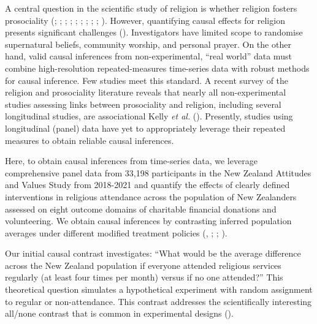 \documentclass[
  single column]{article}
\begin{document}
A central question in the scientific study of religion is whether
religion fosters prosociality (; ;
;
;
;
; ; ;
;
). However,
quantifying causal effects for religion presents significant challenges
(). Investigators
have limited scope to randomise supernatural beliefs, community worship,
and personal prayer. On the other hand, valid causal inferences from
non-experimental, ``real world'' data must combine high-resolution
repeated-measures time-series data with robust methods for causal
inference. Few studies meet this standard. A recent survey of the
religion and prosociality literature reveals that nearly all
non-experimental studies assessing links between prosociality and
religion, including several longitudinal studies, are associational
Kelly \emph{et al.} ().
Presently, studies using longitudinal (panel) data have yet to
appropriately leverage their repeated measures to obtain reliable causal
inferences.

Here, to obtain causal inferences from time-series data, we leverage
comprehensive panel data from 33,198 participants in the New Zealand
Attitudes and Values Study from 2018-2021 and quantify the effects of
clearly defined interventions in religious attendance across the
population of New Zealanders assessed on eight outcome domains of
charitable financial donations and volunteering. We obtain causal
inferences by contrasting inferred population averages under different
modified treatment policies (, ;
;
).

Our initial causal contrast investigates: ``What would be the average
difference across the New Zealand population if everyone attended
religious services regularly (at least four times per month) versus if
no one attended?'' This theoretical question simulates a hypothetical
experiment with random assignment to regular or non-attendance. This
contrast addresses the scientifically interesting all/none contrast that
is common in experimental designs ().
\end{document}
